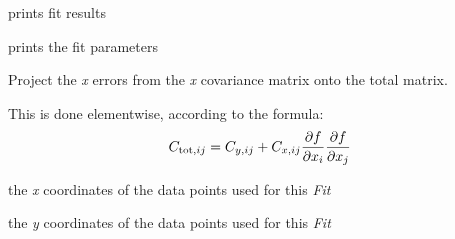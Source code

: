 \documentclass[a4paper,10pt,english]{sphinxmanual}
\begin{document}
\begin{fulllineitems}
\begin{fulllineitems}
\label{index:kafe.fit.Fit.print_fit_results}
prints fit results

\end{fulllineitems}


\begin{fulllineitems}
\label{index:kafe.fit.Fit.print_rounded_fit_parameters}
prints the fit parameters

\end{fulllineitems}


\begin{fulllineitems}
\label{index:kafe.fit.Fit.project_x_covariance_matrix}
Project the \emph{x} errors from the \emph{x} covariance matrix onto the total matrix.

This is done elementwise, according to the formula:
\begin{gather}
\begin{split}C_{\text{tot},ij} = C_{y,ij} + C_{x,ij}  \frac{\partial f}{\partial x_i}  \frac{\partial f}{\partial x_j} \end{split}\notag
\end{gather}
\end{fulllineitems}


\begin{fulllineitems}
\label{index:kafe.fit.Fit.xdata}
the \emph{x} coordinates of the data points used for this \emph{Fit}

\end{fulllineitems}


\begin{fulllineitems}
\label{index:kafe.fit.Fit.ydata}
the \emph{y} coordinates of the data points used for this \emph{Fit}

\end{fulllineitems}


\end{fulllineitems}
\end{document}
